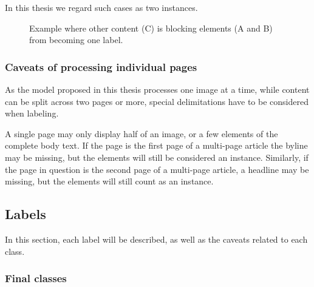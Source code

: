 \documentclass[oneside, english, bibtex]{kththesis}
\begin{document}
In this thesis we regard such cases as two instances.

\begin{figure}[H]
\caption{Example where other content (C) is blocking elements (A and B) from becoming one label.}
\label{fig:blockingelements}%
\end{figure}

\subsubsection{Caveats of processing individual pages}
\label{subs:caveatsindividualpages}

As the model proposed in this thesis processes one image at a time, while content can be split across two pages or more, special delimitations have to be considered when labeling.

A single page may only display half of an image, or a few elements of the complete body text.
If the page is the first page of a multi-page article the byline may be missing, but the elements will still be considered an instance.
Similarly, if the page in question is the second page of a multi-page article, a headline may be missing, but the elements will still count as an instance.

\subsection{Labels}

In this section, each label will be described, as well as the caveats related to each class.


\subsubsection{Final classes}
\label{subs:finalclasses}
\end{document}
